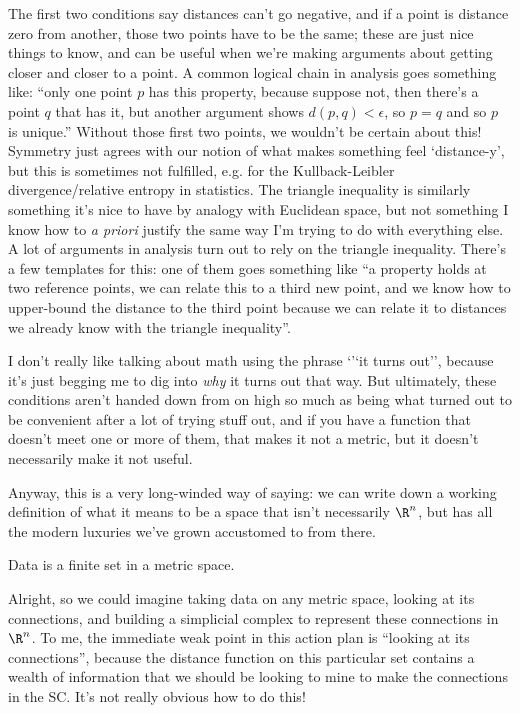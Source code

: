\documentclass{lec}
\begin{document}
    {\footnotesize 
    The first two conditions say distances can't go negative, and if a point is distance zero from another, those two points have to be the same; these are just nice things to know, and can be useful when we're making arguments about getting closer and closer to a point. A common logical chain in analysis goes something like: ``only one point $p$ has this property, because suppose not, then there's a point $q$ that has it, but another argument shows $d(p, q) < \epsilon$, so $p = q$ and so $p$ is unique.'' Without those first two points, we wouldn't be certain about this! Symmetry just agrees with our notion of what makes something feel `distance-y', but this is sometimes not fulfilled, e.g. for the Kullback-Leibler divergence/relative entropy in statistics. The triangle inequality is similarly something it's nice to have by analogy with Euclidean space, but not something I know how to \textit{a priori} justify the same way I'm trying to do with everything else. A lot of arguments in analysis turn out to rely on the triangle inequality. There's a few templates for this: one of them goes something like ``a property holds at two reference points, we can relate this to a third new point, and we know how to upper-bound the distance to the third point because we can relate it to distances we already know with the triangle inequality''.
    
    I don't really like talking about math using the phrase `'`it turns out'', because it's just begging me to dig into \textit{why} it turns out that way. But ultimately, these conditions aren't handed down from on high so much as being what turned out to be convenient after a lot of trying stuff out, and if you have a function that doesn't meet one or more of them, that makes it not a metric, but it doesn't necessarily make it not useful.
    }

    Anyway, this is a very long-winded way of saying: we can write down a working definition of what it means to be a space that isn't necessarily $\R^n$, but has all the modern luxuries we've grown accustomed to from there.

    \begin{definition}
        Data is a finite set in a metric space.
    \end{definition}

    Alright, so we could imagine taking data on any metric space, looking at its connections, and building a simplicial complex to represent these connections in $\R^n$. To me, the immediate weak point in this action plan is ``looking at its connections'', because the distance function on this particular set contains a wealth of information that we should be looking to mine to make the connections in the SC. It's not really obvious how to do this!
\end{document}
